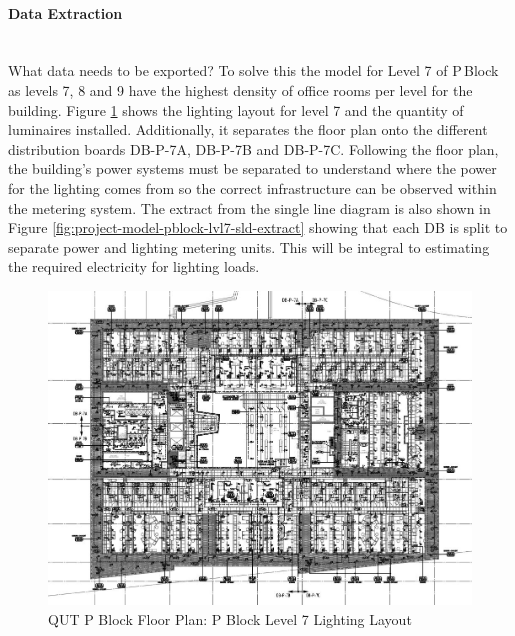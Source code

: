 \paragraph{Data Extraction}
~~\\
What data needs to be exported? To solve this the model for Level 7 of P\,Block as levels 7, 8 and 9 have the highest density of office rooms per level for the building. Figure \ref{fig:project-model-pblock-lvl7} shows the lighting layout for level 7 and the quantity of luminaires installed. Additionally, it separates the floor plan onto the different distribution boards DB-P-7A, DB-P-7B and DB-P-7C. Following the floor plan, the building's power systems must be separated to understand where the power for the lighting comes from so the correct infrastructure can be observed within the metering system. The extract from the single line diagram is also shown in Figure \ref{fig:project-model-pblock-lvl7-sld-extract} showing that each DB is split to separate power and lighting metering units. This will be integral to estimating the required electricity for lighting loads.      

\begin{figure}[H]
	\hfill\includegraphics[width = 120mm]{images/project-model/qut-lvl7-lighting}\hspace*{\fill}
	\caption{QUT P Block Floor Plan: P Block Level 7 Lighting Layout} 
	\label{fig:project-model-pblock-lvl7}
\end{figure}

